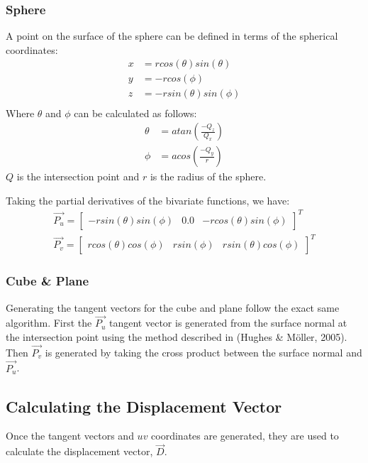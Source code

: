 \subsubsection*{Sphere}
A point on the surface of the sphere can be defined in terms of the spherical
coordinates:
\begin{equation}
\begin{split}
  x &= rcos(\theta)sin(\theta) \\
  y &= -rcos(\phi) \\
  z &= -rsin(\theta)sin(\phi) \\
\end{split}
\end{equation}
Where $\theta$ and $\phi$ can be calculated as follows:
\begin{equation}
\begin{split}
  \theta &= atan(\frac{-Q_{z}}{Q_{x}}) \\
  \phi &= acos(\frac{-Q_{y}}{r})
\end{split}
\end{equation}
$Q$ is the intersection point and $r$ is the radius of the sphere.

Taking the partial derivatives of the bivariate functions, we have:
\begin{equation}
\begin{split}
  \vec{P_{u}} = \begin{bmatrix} -rsin(\theta)sin(\phi) & 0.0 & 
  -rcos(\theta)sin(\phi) \end{bmatrix}^{T} \\
  \vec{P_{v}} = \begin{bmatrix} rcos(\theta)cos(\phi) & rsin(\phi) &
  rsin(\theta)cos(\phi) \end{bmatrix}^{T}
\end{split}
\end{equation}

\subsubsection*{Cube \& Plane}
Generating the tangent vectors for the cube and plane follow the exact same
algorithm. First the $\vec{P_{u}}$ tangent vector is generated from the surface 
normal at the intersection point using the method described in 
(Hughes \& M{\"o}ller, 2005). Then $\vec{P_{v}}$ is generated by taking the 
cross product between the surface normal and $\vec{P_{u}}$.

\subsection{Calculating the Displacement Vector}
Once the tangent vectors and $uv$ coordinates are generated, they are used to
calculate the displacement vector, $\vec{D}$.

